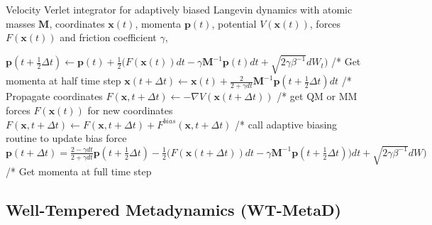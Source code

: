\begin{algorithm}[H]
  \caption{Velocity Verlet integrator for adaptively biased Langevin dynamics with atomic masses $\textbf{M}$, coordinates $\textbf{x}(t)$, momenta $\textbf{p}(t)$, potential $V(\textbf{x}(t))$, forces $F(\textbf{x}(t))$ and friction coefficient $\gamma$,}
  \label{alg:ABM}
    \begin{algorithmic}
        \STATE
            \STATE $\textbf{p}(t+\frac{1}{2}\Delta t) \leftarrow \textbf{p}(t) + \frac{1}{2} \bigl(F(\textbf{x}(t))dt-\gamma \textbf{M}^{-1}\textbf{p}(t) dt + \sqrt{2\gamma\beta^{-1}}dW_t \bigr)$
        \STATE /* Get momenta at half time step
        \STATE
            \STATE $\textbf{x}(t+\Delta t) \leftarrow \textbf{x}(t) + \frac{2}{2+\gamma dt}\textbf{M}^{-1} \textbf{p}(t+\frac{1}{2}\Delta t) dt$
        \STATE /* Propagate coordinates
        \STATE
        \STATE $F(\textbf{x},t+\Delta t) \leftarrow - \nabla V(\textbf{x}(t+\Delta t))$
        \STATE /* get QM or MM forces $F(\textbf{x}(t))$ for new coordinates
        \STATE
        \STATE $F(\textbf{x},t+\Delta t) \leftarrow F(\textbf{x},t+\Delta t) + F^{bias}(\textbf{x},t+\Delta t)$
        \STATE /* call adaptive biasing routine to update bias force
        \STATE
            \STATE $\textbf{p}(t+\Delta t) = \frac{2 - \gamma dt}{2+\gamma dt} \textbf{p}(t+\frac{1}{2}\Delta t) - \frac{1}{2} \bigl(F(\textbf{x}(t+\Delta t))dt-\gamma \textbf{M}^{-1}\textbf{p}(t+\frac{1}{2}\Delta t)) dt + \sqrt{2\gamma\beta^{-1}}dW\bigr)$
        \STATE /* Get momenta at full time step
        \STATE
      \ENDWHILE
    \end{algorithmic}
\end{algorithm}

\subsection{Well-Tempered Metadynamics (WT-MetaD)}
\label{sec:metaD}

